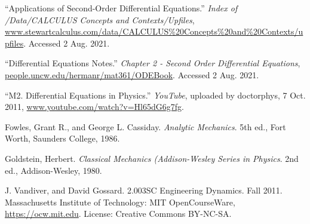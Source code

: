 \renewcommand{\refname}{{Works Cited}}

\begin{thebibliography}{12}

“Applications of Second-Order Differential Equations.” \emph{Index of /Data/CALCULUS Concepts and Contexts/Upfiles}, \url{www.stewartcalculus.com/data/CALCULUS\%20Concepts\%20and\%20Contexts/upfiles}. Accessed 2 Aug. 2021.

“Differential Equations Notes.” \emph{Chapter 2 - Second Order Differential Equations}, \url{people.uncw.edu/hermanr/mat361/ODEBook}. Accessed 2 Aug. 2021.

“M2. Differential Equations in Physics.” \emph{YouTube}, uploaded by doctorphys, 7 Oct. 2011, \url{www.youtube.com/watch?v=Hl65dG6g7fg}.

Fowles, Grant R., and George L. Cassiday. \emph{Analytic Mechanics}. 5th ed., Fort Worth, Saunders College, 1986.

Goldstein, Herbert. \emph{Classical Mechanics (Addison-Wesley Series in Physics}. 2nd ed., Addison-Wesley, 1980.

J. Vandiver, and David Gossard. 2.003SC Engineering Dynamics. Fall 2011. Massachusetts Institute of Technology: MIT OpenCourseWare, \url{https://ocw.mit.edu}. License: Creative Commons BY-NC-SA.


\end{thebibliography}


